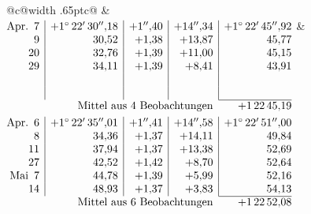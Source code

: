 \noindent\begin{tabular}{@{}c@{\hspace{.4em}\vrule width .65pt\hspace{.4em}}c@{}}
 &
 \\[.18ex]
\(\begin{array}[t]{@{}r|r|r|r|r@{}}
\text{Apr.}\enspace 7 & +1^\circ\,22'\,30''{,}18 & +1''{,}40 & +14''{,}34 & +1^\circ\,22'\,45''{,}92\\
9 & 30{,}52 & +1{,}38 & +13{,}87 & 45{,}77\\
20 & 32{,}76 & +1{,}39 & +11{,}00 & 45{,}15\\
29 & 34{,}11 & +1{,}39 & +8{,}41 & 43{,}91\\
 & & & & \\
 & & & & \\
\cline{5-5}
\multicolumn{4}{r}{\text{Mittel aus 4 Beobachtungen}} & +1\,22\,45{,}19
\end{array}\)
&
\(\begin{array}[t]{@{}r|r|r|r|r@{}}
\text{Apr.}\enspace 6 & +1^\circ\,22'\,35''{,}01 & +1''{,}41 & +14''{,}58 & +1^\circ\,22'\,51''{,}00\\
8 & 34{,}36 & +1{,}37 & +14{,}11 & 49{,}84\\
11 & 37{,}94 & +1{,}37 & +13{,}38 & 52{,}69\\
27 & 42{,}52 & +1{,}42 & +8{,}70 & 52{,}64\\
\text{Mai}\enspace 7 & 44{,}78 & +1{,}39 & +5{,}99 & 52{,}16\\
14 & 48{,}93 & +1{,}37 & +3{,}83 & 54{,}13\\
\cline{5-5}
\multicolumn{4}{r}{\text{Mittel aus 6 Beobachtungen}} & +1\,22\,52{,}08
\end{array}\)
\end{tabular}\par\medskip
